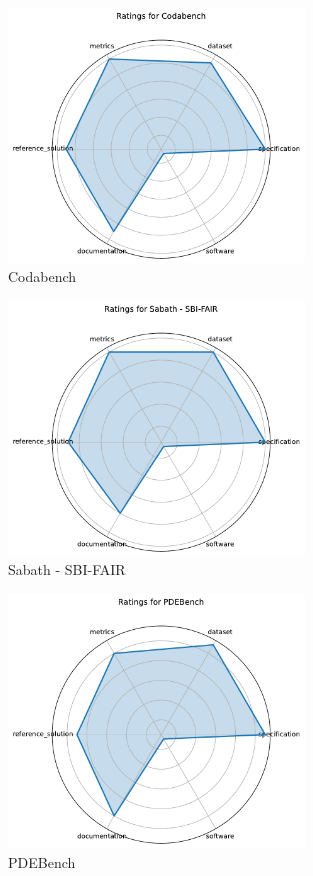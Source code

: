 \documentclass{article}
\begin{document}
\begin{figure}[h!]
  \centering
  \includegraphics[width=0.7\textwidth]{Codabench_radar.pdf}
  \caption{Codabench}
\end{figure}

\begin{figure}[h!]
  \centering
  \includegraphics[width=0.7\textwidth]{Sabath - SBI-FAIR_radar.pdf}
  \caption{Sabath - SBI-FAIR}
\end{figure}

\begin{figure}[h!]
  \centering
  \includegraphics[width=0.7\textwidth]{PDEBench_radar.pdf}
  \caption{PDEBench}
\end{figure}
\end{document}
